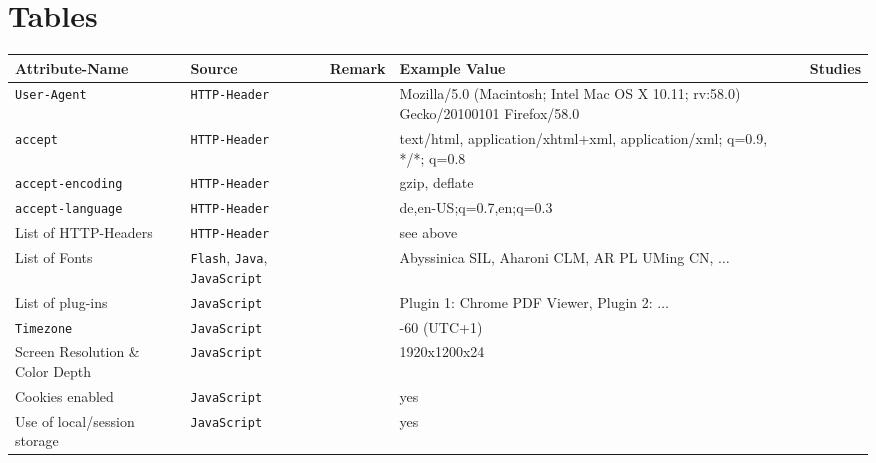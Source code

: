 \appendix

\section{Tables}
\label{fptable}

\begin{table}[!h]
\centering
\footnotesize
\begin{tabular}{|p{3.5cm}|p{2cm}|p{2cm}|p{3cm}|c|}
Attribute-Name & Source & Remark & Example Value & Studies\\ \hline \hline
\texttt{User-Agent} & \texttt{HTTP-Header} & &Mozilla/5.0 (Macintosh; Intel Mac OS X 10.11; rv:58.0) Gecko/20100101 Firefox/58.0 & \cite{laperdrix_beauty_2016,eckersley_how_2010} \\\hline
\texttt{accept} & \texttt{HTTP-Header} &  & text/html, application/xhtml+xml, application/xml; q=0.9, */*; q=0.8 & \cite{laperdrix_beauty_2016,eckersley_how_2010}\\\hline
\texttt{accept-encoding} & \texttt{HTTP-Header} & & gzip, deflate & \cite{laperdrix_beauty_2016,eckersley_how_2010} \\\hline
\texttt{accept-language} &\texttt{HTTP-Header} & &de,en-US;q=0.7,en;q=0.3 & \cite{laperdrix_beauty_2016,eckersley_how_2010} \\ \hline
List of HTTP-Headers & \texttt{HTTP-Header} & & see above & \cite{laperdrix_beauty_2016} \\\hline
List of Fonts & \texttt{Flash}, \texttt{Java}, \texttt{JavaScript} & & Abyssinica SIL, Aharoni CLM, AR PL UMing CN, $\ldots$ \cite{laperdrix_beauty_2016} & \cite{laperdrix_beauty_2016} \\\hline
List of plug-ins & \texttt{JavaScript} & & Plugin 1: Chrome PDF Viewer, Plugin 2: $\ldots$ \cite{laperdrix_beauty_2016} & \cite{laperdrix_beauty_2016} \\ \hline
\texttt{Timezone} & \texttt{JavaScript} & & -60 (UTC+1) \cite{laperdrix_beauty_2016} & \cite{laperdrix_beauty_2016} \\\hline
Screen Resolution \& Color Depth & \texttt{JavaScript} & & 1920x1200x24 \cite{laperdrix_beauty_2016} & \cite{laperdrix_beauty_2016,acar_fpdetective_2013}\\ \hline
Cookies enabled & \texttt{JavaScript} & & yes \cite{laperdrix_beauty_2016} & \cite{laperdrix_beauty_2016} \\\hline
Use of local/session storage & \texttt{JavaScript} & & yes \cite{laperdrix_beauty_2016} & \cite{laperdrix_beauty_2016} \\\hline

\end{tabular}
\end{table}
